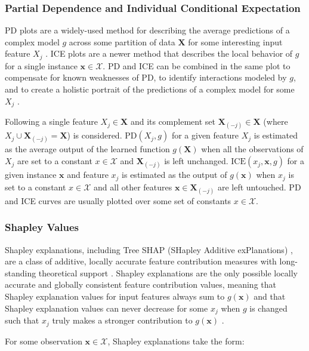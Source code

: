 \documentclass[information,article,submit,moreauthors,pdftex]{definitions/mdpi}
\begin{document}
\subsubsection{Partial Dependence and Individual Conditional Expectation}

PD plots are a widely-used method for describing the average predictions of a complex model $g$ across some partition of data $\mathbf{X}$ for some interesting input feature $X_j$ \cite{esl}. ICE plots are a newer method that describes the local behavior of $g$ for a single instance $\mathbf{x} \in \mathcal{X}$. PD and ICE can be combined in the same plot to compensate for known weaknesses of PD, to identify interactions modeled by $g$, and to create a holistic portrait of the predictions of a complex model for some $X_j$  \cite{ice_plots}.

Following \citet{esl} a single feature $X_j \in \mathbf{X}$ and its complement set $\mathbf{X}_{(-j)} \in \mathbf{X}$ (where $X_j \cup \mathbf{X}_{(-j)} = \mathbf{X}$) is considered. $\text{PD}(X_j, g)$ for a given feature $X_j$ is estimated as the average output of the learned function $g(\mathbf{X})$ when all the observations of $X_j$ are set to a constant $x \in \mathcal{X}$ and $\mathbf{X}_{(-j)}$ is left unchanged. $\text{ICE}(x_j, \mathbf{x}, g)$ for a given instance $\mathbf{x}$ and feature $x_j$ is estimated as the output of $g(\mathbf{x})$ when $x_j$ is set to a constant $x \in \mathcal{X}$ and all other features $\mathbf{x} \in \mathbf{X}_{(-j)}$ are left untouched. PD and ICE curves are usually plotted over some set of constants $x \in \mathcal{X}$. 

\subsubsection{Shapley Values}

Shapley explanations, including Tree SHAP (SHapley Additive exPlanations) , are a class of additive, locally accurate feature contribution measures with long-standing theoretical support \cite{shapley}. Shapley explanations are the only possible locally accurate and globally consistent feature contribution values, meaning that Shapley explanation values for input features always sum to $g(\mathbf{x})$ and that Shapley explanation values can never decrease for some $x_j$ when $g$ is changed such that $x_j$ truly makes a stronger contribution to $g(\mathbf{x})$ \cite{shapley}. 

For some observation $\mathbf{x} \in \mathcal{X}$, Shapley explanations take the form:
\end{document}
